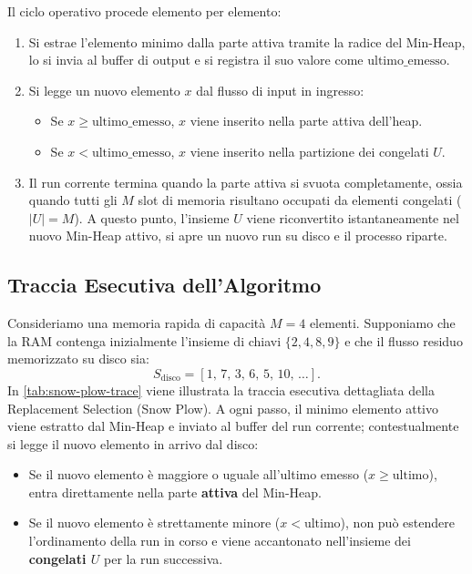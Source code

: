 Il ciclo operativo procede elemento per elemento:
\begin{enumerate}
  \item Si estrae l'elemento minimo dalla parte attiva tramite la radice del Min-Heap, lo si invia al buffer di output e si registra il suo valore come $\text{ultimo\_emesso}$.
  \item Si legge un nuovo elemento $x$ dal flusso di input in ingresso:
  \begin{itemize}
    \item Se $x \ge \text{ultimo\_emesso}$, $x$ viene inserito nella parte attiva dell'heap.
    \item Se $x < \text{ultimo\_emesso}$, $x$ viene inserito nella partizione dei congelati $U$.
  \end{itemize}
  \item Il run corrente termina quando la parte attiva si svuota completamente, ossia quando tutti gli $M$ slot di memoria risultano occupati da elementi congelati ($\vert{}U\vert{} = M$). A questo punto, l'insieme $U$ viene riconvertito istantaneamente nel nuovo Min-Heap attivo, si apre un nuovo run su disco e il processo riparte.
\end{enumerate}

\FloatBarrier
\subsection{Traccia Esecutiva dell'Algoritmo}
\label{subsec:snow-plow-trace}

Consideriamo una memoria rapida di capacit\`a $M = 4$ elementi. Supponiamo che la RAM contenga inizialmente l'insieme di chiavi $\{2, 4, 8, 9\}$ e che il flusso residuo memorizzato su disco sia:
\[
  S_{\text{disco}} = [1, \, 7, \, 3, \, 6, \, 5, \, 10, \, \dots].
\]
In \autoref{tab:snow-plow-trace} viene illustrata la traccia esecutiva dettagliata della Replacement Selection (Snow Plow). A ogni passo, il minimo elemento attivo viene estratto dal Min-Heap e inviato al buffer del run corrente; contestualmente si legge il nuovo elemento in arrivo dal disco:
\begin{itemize}
  \item Se il nuovo elemento \`e maggiore o uguale all'ultimo emesso ($x \ge \text{ultimo}$), entra direttamente nella parte \textbf{attiva} del Min-Heap.
  \item Se il nuovo elemento \`e strettamente minore ($x < \text{ultimo}$), non pu\`o estendere l'ordinamento della run in corso e viene accantonato nell'insieme dei \textbf{congelati $U$} per la run successiva.
\end{itemize}

